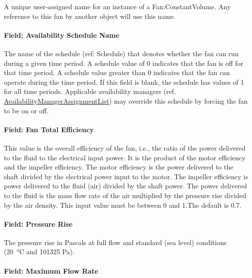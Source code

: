 A unique user-assigned name for an instance of a Fan:ConstantVolume. Any reference to this fan by another object will use this name.

\paragraph{Field: Availability Schedule Name}\label{field-availability-schedule-name-007}

The name of the schedule (ref: Schedule) that denotes whether the fan can run during a given time period. A schedule value of 0 indicates that the fan is off for that time period. A schedule value greater than 0 indicates that the fan can operate during the time period. If this field is blank, the schedule has values of 1 for all time periods. Applicable availability managers (ref. \hyperref[availabilitymanagerassignmentlist]{AvailabilityManagerAssignmentList}) may override this schedule by forcing the fan to be on or off.

\paragraph{Field: Fan Total Efficiency}\label{field-fan-total-efficiency-000}

This value is the overall efficiency of the fan, i.e., the ratio of the power delivered to the fluid to the electrical input power. It is the product of the motor efficiency and the impeller efficiency. The motor efficiency is the power delivered to the shaft divided by the electrical power input to the motor. The impeller efficiency is power delivered to the fluid (air) divided by the shaft power. The power delivered to the fluid is the mass flow rate of the air multiplied by the pressure rise divided by the air density. This input value must be between 0 and 1.The default is 0.7.

\paragraph{Field: Pressure Rise}\label{field-pressure-rise}

The pressure rise in Pascals at full flow and standard (sea level) conditions (\SI{20}{\celsius} and 101325 Pa).

\paragraph{Field: Maximum Flow Rate}\label{field-maximum-flow-rate-000}

